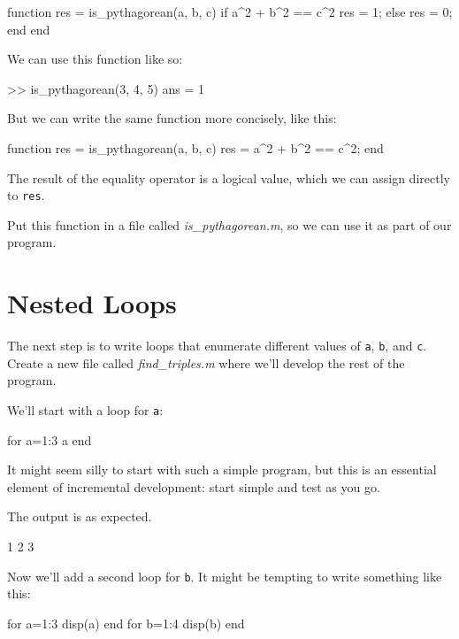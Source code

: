 \documentclass[../../book.tex]{subfiles}
\begin{document}
\begin{code}
function res = is_pythagorean(a, b, c)
    if a^2 + b^2 == c^2
        res = 1;
    else
        res = 0;
    end
end
\end{code}

We can use this function like so:


\begin{code}
>> is_pythagorean(3, 4, 5)
ans = 1
\end{code}

But we can write the same function more concisely, like this:

\begin{code}
function res = is_pythagorean(a, b, c)
    res = a^2 + b^2 == c^2;
end
\end{code}

The result of the equality operator is a logical value, which we can assign directly
to \lstinline{res}.

Put this function in a file called \emph{is\_pythagorean.m}, so we can use it as part of our program.


\section{Nested Loops}

The next step is to write loops that enumerate different values of \lstinline{a}, \lstinline{b}, and
\lstinline{c}.  Create a new file called \emph{find\_triples.m} where we'll develop the rest of the program.


We'll start with a loop for \lstinline{a}:

\begin{code}
for a=1:3
    a
end
\end{code}

It might seem silly to start with such a simple program, but this is an essential element of incremental development: start simple and test as you go.

The output is as expected.

\begin{code}
1
2
3
\end{code}

Now we'll add a second loop for \lstinline{b}.  It might be tempting to write something like this:

\begin{code}
for a=1:3
    disp(a)
end
for b=1:4
    disp(b)
end
\end{code}
\end{document}
